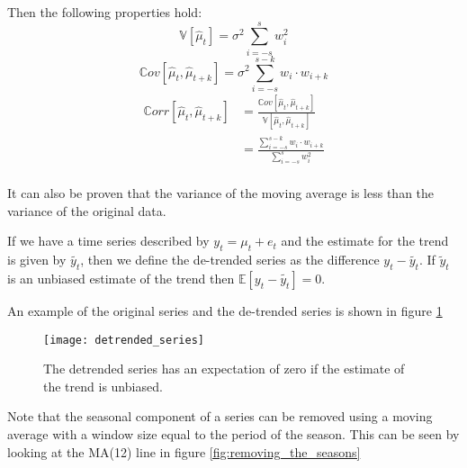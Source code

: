         Then the following properties hold:
        \begin{equation*}
            \mathbb{V}[\hat{\mu}_t] = \sigma^2 \sum_{i = -s}^{s} w^2_i
        \end{equation*}
        \begin{equation*}
            \mathbb{C}ov[\hat{\mu}_t, \hat{\mu}_{t+k}] = 
            \sigma^2 \sum_{i = -s}^{s-k} w_i \cdot w_{i+k}
        \end{equation*}
        \begin{equation*}
            \begin{aligned}
                \mathbb{C}orr[\hat{\mu}_t, \hat{\mu}_{t+k}] &= 
                \frac{\mathbb{C}ov[\hat{\mu}_t, \hat{\mu}_{t+k}]}{
                \mathbb{V}[\hat{\mu}_t, \hat{\mu}_{t+k}]} \\
                                                            &= \frac{
                                                                \sum_{i = -s}^{s-k} w_i \cdot w_{i+k}
                                                                }{ 
                                                                \sum_{i = -s}^{s} w^2_i
                                                            }\\
                                                        \end{aligned}
    \end{equation*}

    It can also be proven that the variance of the moving average is less than the 
    variance of the original data.

    If we have a time series described by $y_t = \mu_t + e_t$ and the estimate
    for the trend is given by $\tilde{y_t}$, then we define the de-trended series
    as the difference $y_t - \tilde{y_t}$. If $\tilde{y}_t$ is an unbiased estimate
    of the trend then $\mathbb{E}[y_t - \tilde{y_t}] = 0$.

    An example of the original series and the de-trended series is shown in figure
    \ref{fig:detrended_series}

    \begin{figure}[t]
        \centering
        \texttt{[image: detrended\_series]}
        \caption{The detrended series has an expectation of zero if the estimate of
        the trend is unbiased.}
        \label{fig:detrended_series}
    \end{figure}

    Note that the seasonal component of a series can be removed using a moving
    average with a window size equal to the period of the season. This can be 
    seen by looking at the MA(12) line in figure \ref{fig:removing_the_seasons}



